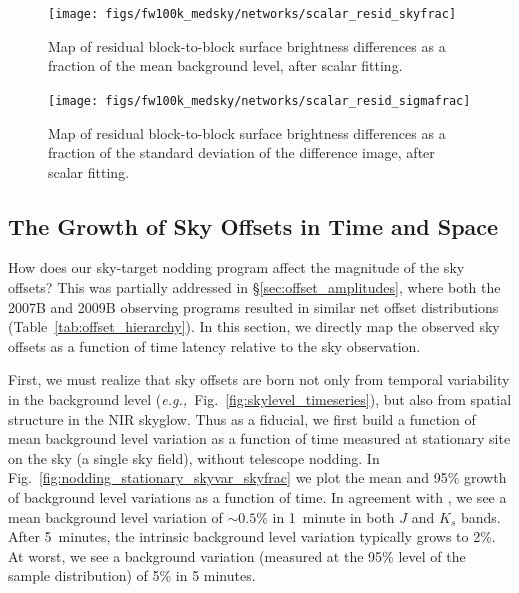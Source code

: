 \documentclass[iop]{emulateapj}
\newcommand{\eg}{\textit{e.g.,~}}
\newcommand{\Fig}[1]{Fig.~\ref{fig:#1}}  %
\newcommand{\Tab}[1]{Table~\ref{tab:#1}}  %
\newcommand{\Sec}[1]{\S\ref{sec:#1}}  %
\begin{document}
\begin{figure}[t]
\centering
\texttt{[image: figs/fw100k\_medsky/networks/scalar\_resid\_skyfrac]}
\caption{Map of residual block-to-block surface brightness differences as a fraction of the mean background level, after scalar fitting.}
\label{fig:fw100k_medsky_scalar_resid_skyfrac}
\end{figure}

\begin{figure}[t]
\centering
\texttt{[image: figs/fw100k\_medsky/networks/scalar\_resid\_sigmafrac]}
\caption{Map of residual block-to-block surface brightness differences as a fraction of the standard deviation of the difference image, after scalar fitting.}
\label{fig:fw100k_medsky_scalar_resid_sigmafrac}
\end{figure}


\subsection{The Growth of Sky Offsets in Time and Space}
\label{sec:offsetevo}


How does our sky-target nodding program affect the magnitude of the sky offsets?
This was partially addressed in \Sec{offset_amplitudes}, where both the 2007B and 2009B observing programs resulted in similar net offset distributions (\Tab{offset_hierarchy}).
In this section, we directly map the observed sky offsets as a function of time latency relative to the sky observation.

First, we must realize that sky offsets are born not only from temporal variability in the background level (\eg \Fig{skylevel_timeseries}), but also from spatial structure in the NIR skyglow.
Thus as a fiducial, we first build a function of mean background level variation as a function of time measured at stationary site on the sky (a single sky field), without telescope nodding.
In \Fig{nodding_stationary_skyvar_skyfrac} we plot the mean and 95\% growth of background level variations as a function of time.
In agreement with \cite{Vaduvescu:2004}, we see a mean background level variation of $\sim 0.5\%$ in 1~minute in both $J$ and $K_s$ bands.
After 5~minutes, the intrinsic background level variation typically grows to 2\%.
At worst, we see a background variation (measured at the 95\% level of the sample distribution) of 5\% in 5 minutes.
\end{document}
